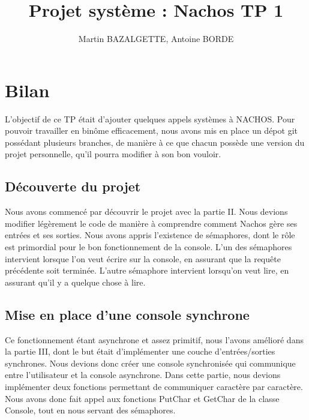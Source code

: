 \documentclass[12pt]{article}
\begin{document}
\title{Projet système : Nachos TP 1}
\author{Martin BAZALGETTE, Antoine BORDE}

\maketitle
\newpage
\tableofcontents
\newpage

\section{Bilan}
L'objectif de ce TP était d'ajouter quelques appels systèmes à NACHOS.
\newline
Pour pouvoir travailler en binôme efficacement, nous avons mis en place un dépot git possédant plusieurs branches, de manière à ce que chacun possède une version du projet personnelle, qu'il pourra modifier à son bon vouloir.

\bigbreak
\subsection{Découverte du projet}
Nous avons commencé par découvrir le projet avec la partie II. Nous devions modifier légèrement le code de manière à comprendre comment Nachos gère ses entrées et ses sorties.
Nous avons appris l'existence de sémaphores, dont le rôle est primordial pour le bon fonctionnement de la console.
L'un des sémaphores intervient lorsque l'on veut écrire sur la console, en assurant que la requête précédente soit terminée. L'autre sémaphore intervient lorsqu'on veut lire, en assurant qu'il y a quelque chose à lire.

\bigbreak
\subsection{Mise en place d'une console synchrone}
Ce fonctionnement étant asynchrone et assez primitif, nous l'avons amélioré dans la partie III, dont le but était d'implémenter une couche d'entrées/sorties synchrones. Nous devions donc créer une console synchronisée qui communique entre l'utilisateur et la console asynchrone.
Dans cette partie, nous devions implémenter deux fonctions permettant de communiquer caractère par caractère. Nous avons donc fait appel aux fonctions \textcolor{red2}{PutChar} et \textcolor{red2}{GetChar} de la classe Console, tout en nous servant des sémaphores.

\bigbreak
\end{document}
